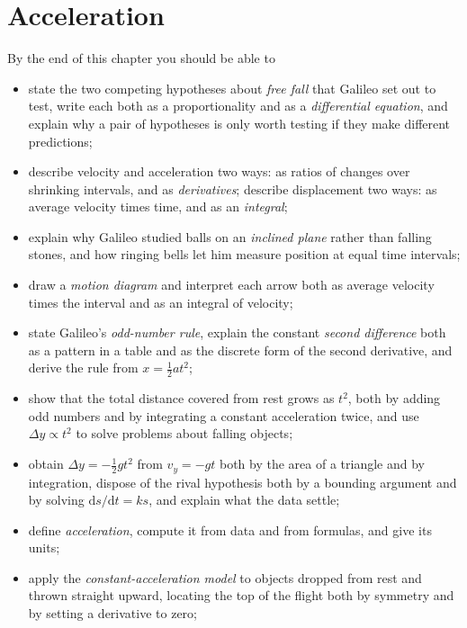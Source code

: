 \documentclass[11pt,twoside,openany]{book}
\newcommand{\dd}{\mathrm{d}}
\begin{document}
\setcounter{chapter}{1}

\chapter{Acceleration}

\begin{tcolorbox}[enhanced,breakable,colback=white,colframe=teal,sharp corners,boxrule=1pt,
  title=\textbf{In this chapter},coltitle=white,colbacktitle=teal,left=3mm,right=3mm]
By the end of this chapter you should be able to
\begin{itemize}[itemsep=2pt,topsep=2pt]
  \item state the two competing hypotheses about \emph{free fall} that Galileo set out to test, write each both as a proportionality and as a \emph{differential equation}, and explain why a pair of hypotheses is only worth testing if they make different predictions;
  \item describe velocity and acceleration two ways: as ratios of changes over shrinking intervals, and as \emph{derivatives}; describe displacement two ways: as average velocity times time, and as an \emph{integral};
  \item explain why Galileo studied balls on an \emph{inclined plane} rather than falling stones, and how ringing bells let him measure position at equal time intervals;
  \item draw a \emph{motion diagram} and interpret each arrow both as average velocity times the interval and as an integral of velocity;
  \item state Galileo's \emph{odd-number rule}, explain the constant \emph{second difference} both as a pattern in a table and as the discrete form of the second derivative, and derive the rule from $x = \tfrac12 a t^2$;
  \item show that the total distance covered from rest grows as $t^2$, both by adding odd numbers and by integrating a constant acceleration twice, and use $\Delta y \propto t^2$ to solve problems about falling objects;
  \item obtain $\Delta y = -\tfrac12 g t^2$ from $v_y = -g t$ both by the area of a triangle and by integration, dispose of the rival hypothesis both by a bounding argument and by solving $\dd s/\dd t = k s$, and explain what the data settle;
  \item define \emph{acceleration}, compute it from data and from formulas, and give its units;
  \item apply the \emph{constant-acceleration model} to objects dropped from rest and thrown straight upward, locating the top of the flight both by symmetry and by setting a derivative to zero;

\end{itemize}
\end{tcolorbox}
\end{document}
